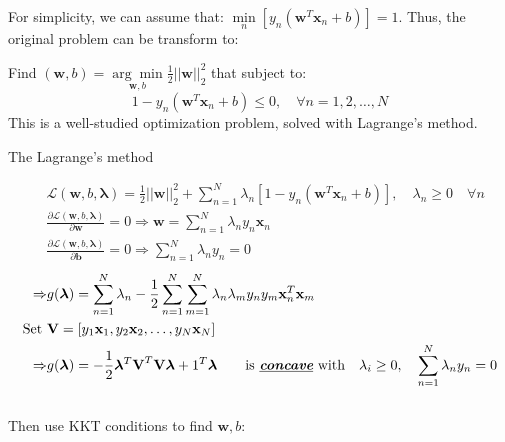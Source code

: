 For simplicity, we can assume that: $\underset{n}{\min}\left[ y_n(\textbf{w}^T \textbf{x}_n+b) \right] = 1$. Thus, the original problem can be transform to:

 Find $\displaystyle (\textbf{w},b) = \underset{\textbf{w}, b}{\arg\min} \frac{1}{2}||\textbf{w}||^2_2$ that subject to:
\begin{equation*}
	1-y_n(\textbf{w}^T\textbf{x}_n+b) \leq 0, \quad \forall n = 1, 2, \dots, N
\end{equation*}
This is a well-studied optimization problem, solved with Lagrange's method.

 The Lagrange's method

\begin{align}
	& \mathcal{L}(\textbf{w}, b, \boldsymbol{\lambda}) = \frac{1}{2} ||\textbf{w}||^2_2 + \sum_{n=1}^{N} \lambda_n [1 - y_n(\textbf{w}^T\textbf{x}_n+b)], \quad \lambda_n \geq 0 \quad \forall n\\
	& \frac{\partial \mathcal{L}(\textbf{w}, b, \boldsymbol{\lambda})}{\partial\textbf{w}} = 0 \Rightarrow \textbf{w} = \sum_{n=1}^{N} \lambda_n y_n \textbf{x}_n \\
	& \frac{\partial \mathcal{L}(\textbf{w}, b, \boldsymbol{\lambda})}{\partial\textbf{b}} = 0 \Rightarrow \sum_{n=1}^{N} \lambda_n y_n =0
\end{align}
\begin{align}
	\Rightarrow & g(\boldsymbol{\lambda}) = \sum_{n=1}^{N} \lambda_n - \frac{1}{2} \sum_{n=1}^{N} \sum_{m=1}^{N} \lambda_n \lambda_m y_n y_m \textbf{x}_n^T \textbf{x}_m \\
	\text{Set } & \textbf{V} = \left[ y_1\textbf{x}_1, y_2\textbf{x}_2, \dots, y_N\textbf{x}_N \right] \\
	\Rightarrow & g(\boldsymbol{\lambda}) = - \frac{1}{2} \boldsymbol{\lambda}^T \textbf{V}^T \textbf{V} \boldsymbol{\lambda} + 1^T\boldsymbol{\lambda} \qquad \text{is \textbf{\emph{\underline{concave}}} with} \quad \lambda_i \geq 0, \quad \sum_{n=1}^{N} \lambda_n y_n = 0
\end{align}
\\
Then use \ac{KKT} conditions to find $\textbf{w}, b$:\\

